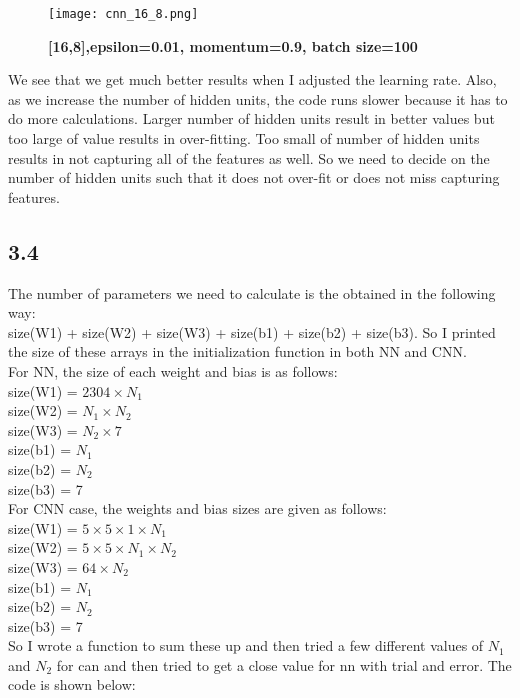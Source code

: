 \documentclass[10pt]{article}
\begin{document}
\begin{figure}[H]
	\centering
	\texttt{[image: cnn\_16\_8.png]}
	\caption{\textbf{[16,8],epsilon=0.01, momentum=0.9, batch size=100}}
	\label{fig:}
\end{figure}

We see that we get much better results when I adjusted the learning rate. Also, as we increase the number of hidden units, the code runs slower because it has to do more calculations. Larger number of hidden units result in better values but too large of value results in over-fitting. Too small of number of hidden units results in not capturing all of the features as well. So we need to decide on the number of hidden units such that it does not over-fit or does not miss capturing features.




\subsection*{3.4}
The number of parameters we need to calculate is the obtained in the following way: \\
size(W1) + size(W2) + size(W3) + size(b1) + size(b2) + size(b3). So I printed the size of these arrays in the initialization function in both NN and CNN. \\ 
For NN, the size of each weight and bias is as follows: \\ 
size(W1) = $2304 \times N_1$ \\
size(W2) = $N_1  \times N_2$ \\
size(W3) = $N_2  \times 7$ \\
size(b1)  = $N_1$ \\ 
size(b2)  = $N_2$ \\ 
size(b3)  = 7 \\

For CNN case, the weights and bias sizes are given as follows: \\
size(W1) = $5 \times 5 \times 1 \times N_1$\\
size(W2) = $5 \times 5 \times N_1 \times N_2$ \\
size(W3) = $64 \times N_2$ \\
size(b1)  = $N_1$ \\ 
size(b2)  = $N_2$ \\ 
size(b3)  = 7 \\

So I wrote a function to sum these up and then tried a few different values of $N_1$ and $N_2$ for can and then tried to get a close value for nn with trial and error. The code is shown below:
\end{document}
